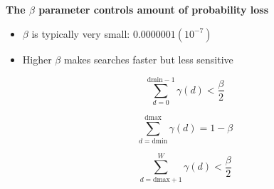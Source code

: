 \documentclass[landscape]{slides}
\begin{document}
\begin{slide}
\begin{center}
\textbf{The $\beta$ parameter controls amount of probability loss}
\end{center}

\begin{minipage}{6.5in}


\vspace{1in}
\begin{itemize} 
\small
\item $\beta$ is typically very small: $0.0000001 (10^{-7})$
\medskip
\medskip
\item Higher $\beta$ makes searches faster but less sensitive
\end{itemize}

\vspace{1.5in}
\end{minipage}
\begin{minipage}{4in}

\small

\[
   \sum_{d = 0}^{\mbox{dmin} - 1} \gamma(d) < \frac{\beta}{2}
\]

\[
   \sum_{d = \mbox{dmin}}^{\mbox{dmax}} \gamma(d) = 1 - \beta
\]

\[
   \sum_{d = \mbox{dmax} + 1}^{W} \gamma(d) < \frac{\beta}{2}
\]


\vspace{3in}
\end{minipage}


\end{slide}
\end{document}
